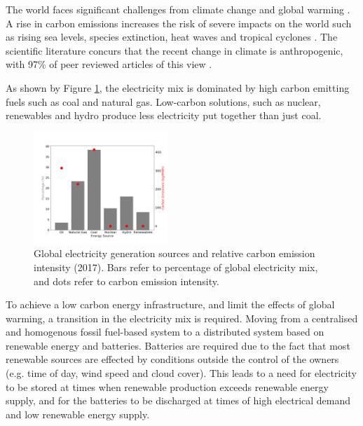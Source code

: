 
The world faces significant challenges from climate change and global warming \cite{Masson-Delmotte2018}. A rise in carbon emissions increases the risk of severe impacts on the world such as rising sea levels, species extinction, heat waves and tropical cyclones \cite{IPCC2014}. The scientific literature concurs that the recent change in climate is anthropogenic, with 97\% of peer reviewed articles of this view \cite{Cook2013}.  

{\color{red}
As shown by Figure \ref{fig:fuel_emissions_market_share}, the electricity mix is dominated by high carbon emitting fuels such as coal and natural gas. Low-carbon solutions, such as nuclear, renewables and hydro  produce less electricity put together than just coal.





\begin{figure}
	\begin{center}

		\includegraphics[width=0.45\textwidth]{figures/elec_gen_carbon.png}
		\caption{{\color{red}Global electricity generation sources and relative carbon emission intensity (2017). Bars refer to percentage of global electricity mix, and dots refer to carbon emission intensity}. ~\cite{BP2018,Hall1983}}
		\label{fig:fuel_emissions_market_share}
	\end{center}
\end{figure}


To achieve a low carbon energy infrastructure, and limit the effects of global warming, a transition in the electricity mix is required. Moving from a centralised and homogenous fossil fuel-based system to a distributed system based on renewable energy and batteries. Batteries are required due to the fact that most renewable sources are effected by conditions outside the control of the owners (e.g. time of day, wind speed and cloud cover). This leads to a need for electricity to be stored at times when renewable production exceeds renewable energy supply, and for the batteries to be discharged at times of high electrical demand and low renewable energy supply. 


}
